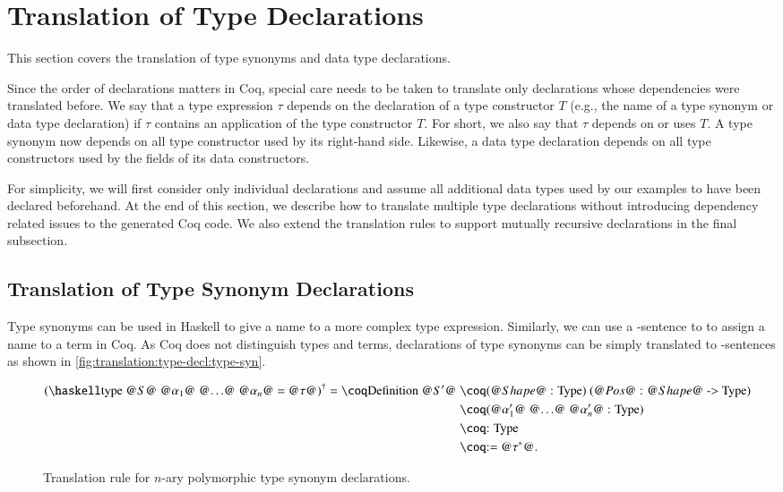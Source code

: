 \section{Translation of Type Declarations} \label{sec:translation:type-decl}
This section covers the translation of type synonyms and data type declarations.

Since the order of declarations matters in Coq, special care needs to be taken to translate only declarations whose dependencies were translated before.
We say that a type expression $\tau$ depends on the declaration of a type constructor $T$ (e.g., the name of a type synonym or data type declaration) if $\tau$ contains an application of the type constructor $T$.
For short, we also say that $\tau$ depends on or uses $T$.
A type synonym now depends on all type constructor used by its right-hand side.
Likewise, a data type declaration depends on all type constructors used by the fields of its data constructors.

For simplicity, we will first consider only individual declarations and assume all additional data types used by our examples to have been declared beforehand.
At the end of this section, we describe how to translate multiple type declarations without introducing dependency related issues to the generated Coq code.
We also extend the translation rules to support mutually recursive declarations in the final subsection.

\subsection{Translation of Type Synonym Declarations} \label{sec:translation:type-decl:type-syn}
Type synonyms can be used in Haskell to give a name to a more complex type expression.
Similarly, we can use a -sentence to to assign a name to a term in Coq.
As Coq does not distinguish types and terms, declarations of type synonyms can be simply translated to -sentences as shown in \autoref{fig:translation:type-decl:type-syn}.

\begin{figure}[H]
  \begin{align*}
    \toCoq{(
      \haskellM{type @$S$@ @$\alpha_1$@ @$\ldots$@ @$\alpha_n$@ = @$\tau$@}
     )}
    = \coqM{Definition @$S'$@} &\;\coqM{(@$\Shape$@ : Type) (@$\Pos$@ : @$\Shape$@ -> Type)           } \\
                               &\;\coqM{(@$\alpha_1'$@ @$\ldots$@ @$\alpha_n'$@ : Type)} \\
                               &\;\coqM{: Type                                         } \\
                               &\;\coqM{:= @$\toCoqTX{\tau}$@.                             }
  \end{align*}
  \caption{Translation rule for $n$-ary polymorphic type synonym declarations.}
  \label{fig:translation:type-decl:type-syn}
\end{figure}

